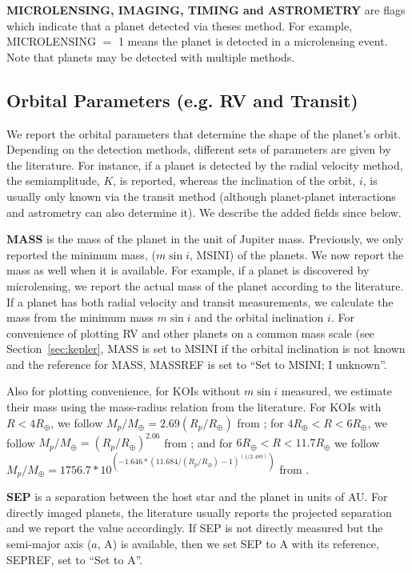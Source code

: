 \documentclass[11pt,preprint]{aastex}
\def\rearth{R_\oplus}
\def\mearth{M_\oplus}
\begin{document}
\begin{CJK*}{UTF8}{gbsn}
{\bf MICROLENSING, IMAGING, TIMING and ASTROMETRY} are flags which
indicate that a planet detected via theses method. For example,
MICROLENSING $=$ 1 means the planet is detected in a microlensing
event. Note that planets may be detected with multiple methods. 


\subsection{Orbital Parameters (e.g. RV and Transit)}\label{sec:orbit}

We report the orbital parameters that determine the shape of the
planet's orbit. Depending on the detection methods, different sets of
parameters are given by the literature. For instance, if a planet is
detected by the radial velocity method, the semiamplitude, $K$, is
reported, whereas the inclination of the orbit, $i$, is usually only known via the
transit method (although planet-planet interactions and astrometry can also determine it). We describe the added fields since \cite{Wright2011}
below.  

{\bf MASS} is the mass of the planet in the unit of Jupiter
mass. Previously, we only reported the minimum mass, ($m\sin{i}$,
MSINI) of the planets. We now report the mass as well when it is
available. For example, if a planet is discovered by microlensing, we
report the actual mass of the planet according to the literature. If a
planet has both radial velocity and transit measurements, we calculate
the mass from the minimum mass $m\sin{i}$ and the orbital inclination
$i$. For convenience of plotting RV and other planets on a common mass scale (see Section~\ref{sec:kepler}, MASS is set to MSINI if the orbital inclination is not known and
the reference for MASS, MASSREF is set to ``Set to MSINI; I unknown''.

Also for plotting convenience, for KOIs without $m\sin{i}$ measured, we estimate their mass using the
mass-radius relation from the literature. For KOIs with $R<4\rearth$, we follow $M_{p}/\mearth=2.69(R_{p}/\rearth)$
from \cite{Weiss2014}; for $4\rearth<R<6\rearth$, we follow $M_{p}/\mearth=(R_{p}/\rearth)^2.06$ from
\cite{Lissauer2011}; and for $6\rearth<R<11.7\rearth$ we follow $M_{p}/\mearth=1756.7*10^{(-1.646*(11.684/(R_{p}/\rearth)-1)^{(1/2.489)})}$
from \cite{Mordasini2012}. 

{\bf SEP} is a separation between the host star
and the planet in units of AU. For directly imaged planets, the
literature usually reports the projected separation and we report the
value accordingly.  If SEP is not directly measured but the semi-major
axis ($a$, A) is available, then we set SEP to A with its reference,
SEPREF, set to ``Set to A''. 


\end{CJK*}
\end{document}
